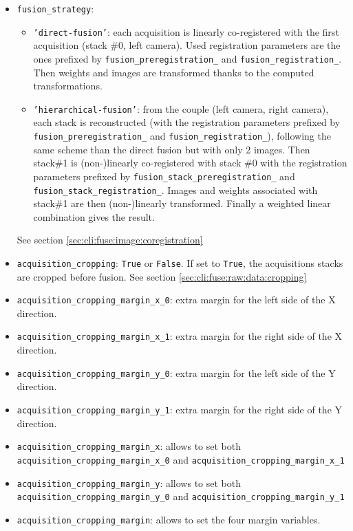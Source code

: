 \begin{itemize}
\item \texttt{fusion\_strategy}:
  \begin{itemize}
  \itemsep -0.5ex
  \item \texttt{'direct-fusion'}: each acquisition is linearly 
  co-registered with the first acquisition (stack \#0, left camera). 
  Used registration parameters are the ones  prefixed by 
  \texttt{fusion\_preregistration\_} and 
  \texttt{fusion\_registration\_}.
  Then weights and images are transformed thanks to the 
  computed transformations.
  \item \texttt{'hierarchical-fusion'}: from the couple 
  (left camera, right camera), each stack is reconstructed (with the
  registration parameters prefixed by 
  \texttt{fusion\_preregistration\_} and 
  \texttt{fusion\_registration\_}), following the same scheme than 
  the direct fusion but with only 2 images. 
  Then stack\#1 is (non-)linearly co-registered with stack \#0 with the
  registration parameters prefixed by 
  \texttt{fusion\_stack\_preregistration\_} and 
  \texttt{fusion\_stack\_registration\_}.
   Images and weights associated with stack\#1 are then (non-)linearly 
   transformed. Finally a weighted linear combination gives the result.
  \end{itemize}
  See section \ref{sec:cli:fuse:image:coregistration}
  
\item \texttt{acquisition\_cropping}:
  \texttt{True} or \texttt{False}. If set to \texttt{True}, 
  the acquisitions stacks are cropped before fusion.
  See section \ref{sec:cli:fuse:raw:data:cropping}
\item \texttt{acquisition\_cropping\_margin\_x\_0}:
  extra margin for the left side of the X direction.
\item \texttt{acquisition\_cropping\_margin\_x\_1}:
  extra margin for the right side of the X direction.
\item \texttt{acquisition\_cropping\_margin\_y\_0}:
  extra margin for the left side of the Y direction.
\item \texttt{acquisition\_cropping\_margin\_y\_1}:
  extra margin for the right side of the Y direction.
\item \texttt{acquisition\_cropping\_margin\_x}: 
  allows to set both \texttt{acquisition\_cropping\_margin\_x\_0} and
  \texttt{acquisition\_cropping\_margin\_x\_1}
\item \texttt{acquisition\_cropping\_margin\_y}: 
  allows to set both \texttt{acquisition\_cropping\_margin\_y\_0} and
  \texttt{acquisition\_cropping\_margin\_y\_1}
\item \texttt{acquisition\_cropping\_margin}: 
  allows to set the four margin variables.
  

\end{itemize}
